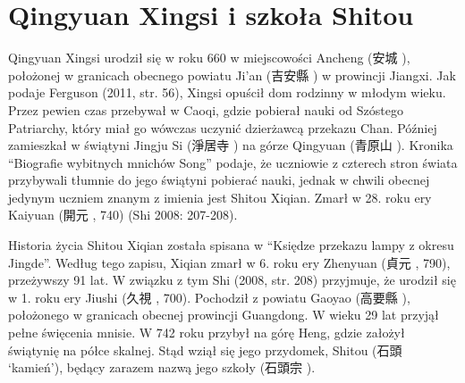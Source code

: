 \section{Qingyuan Xingsi i szkoła Shitou}
Qingyuan Xingsi urodził się w roku 660 w miejscowości Ancheng (安城 ), położonej w granicach obecnego powiatu Ji'an (吉安縣 ) w prowincji Jiangxi.
Jak podaje Ferguson (2011, str. 56), Xingsi opuścił dom rodzinny w młodym wieku.
Przez pewien czas przebywał w Caoqi, gdzie pobierał nauki od Szóstego Patriarchy, który miał go wówczas uczynić dzierżawcą przekazu Chan.
Później zamieszkał w świątyni Jingju Si (淨居寺 ) na górze Qingyuan (青原山 ).
Kronika ``Biografie wybitnych mnichów Song'' podaje, że uczniowie z czterech stron świata przybywali tłumnie do jego świątyni pobierać nauki, jednak w chwili obecnej jedynym uczniem znanym z imienia jest Shitou Xiqian.
Zmarł w 28. roku ery Kaiyuan (開元 , 740)
(Shi 2008: 207-208).

Historia życia Shitou Xiqian została spisana w ``Księdze przekazu lampy z okresu Jingde''.
Według tego zapisu, Xiqian zmarł w 6. roku ery Zhenyuan (貞元 , 790), przeżywszy 91 lat.
W związku z tym Shi (2008, str. 208) przyjmuje, że urodził się w 1. roku ery Jiushi (久視 , 700).
Pochodził z powiatu Gaoyao (高要縣 ), położonego w granicach obecnej prowincji Guangdong.
W wieku 29 lat przyjął pełne święcenia mnisie.
W 742 roku przybył na górę Heng, gdzie założył świątynię na półce skalnej.
Stąd wziął się jego przydomek, Shitou (石頭  `kamień'), będący zarazem nazwą jego szkoły (石頭宗 ).

